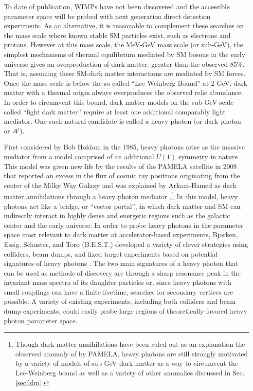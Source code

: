 To date of publication, WIMPs have not been discovered and the accessible parameter space will be probed with next generation direct detection experiments. As an alternative, it is reasonable to complement these searches on the mass scale where known stable SM particles exist, such as electrons and protons. However at this mass scale, the MeV-GeV mass scale (or sub-GeV), the simplest mechanisms of thermal equilibrium mediated by SM bosons in the early universe gives an overproduction of dark matter, greater than the observed 85\%. That is, assuming these SM-dark matter interactions are mediated by SM forces. Once the mass scale is below the so-called ``Lee-Weinberg Bound'' at 2 GeV, dark matter with a thermal origin always overproduces the observed relic abundance. In order to circumvent this bound, dark matter models on the sub-GeV scale called ``light dark matter'' require at least one additional comparably light mediator. One such natural candidate is called a heavy photon (or dark photon or $A^\prime$).

First considered by Bob Holdom in the 1985, heavy photons arise as the massive mediator from a model comprised of an additional $U(1)$ symmetry in nature \cite{Holdom:1985ag}. This model was given new life by the results of the PAMELA satellite in 2008 that reported an excess in the flux of cosmic ray positrons originating from the center of the Milky Way Galaxy \cite{Adriani:2008zr} and was explained by Arkani-Hamed as dark matter annihilations through a heavy photon mediator \cite{ArkaniHamed:2008qn}.\footnote{Though dark matter annihilations have been ruled out as an explanation the observed anomaly of by PAMELA, heavy photons are still strongly motivated by a variety of models of sub-GeV dark matter as a way to circumvent the Lee-Weinberg bound as well as a variety of other anomalies discussed in Sec. \ref{sec:ldm}.} In this model, heavy photons act like a bridge, or ``vector portal'', in which dark matter and SM can indirectly interact in highly dense and energetic regions such as the galactic center and the early universe. In order to probe heavy photons in the parameter space most relevant to dark matter at accelerator-based experiments, Bjorken, Essig, Schuster, and Toro (B.E.S.T.) developed a variety of clever strategies using colliders, beam dumps, and fixed target experiments based on potential signatures of heavy photons \cite{Bjorken:2009mm}. The two main signatures of a heavy photon that can be used as methods of discovery are through a sharp resonance peak in the invariant mass spectra of its daughter particles or, since heavy photons with small couplings can have a finite livetime, searches for secondary vertices are possible. A variety of existing experiments, including both colliders and beam dump experiments, could easily probe large regions of theoretically-favored heavy photon parameter space.

